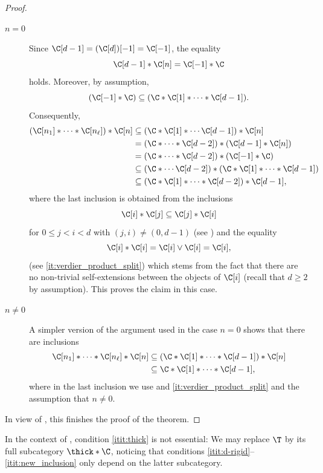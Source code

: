 \documentclass[a4paper]{amsart}
\begin{document}
\begin{proof}
  \begin{description}
  \item[$n=0$] Since $\C[d-1]=(\C[d])[-1]=\C[-1]$, the equality
    \[
      \C[d-1]*\C[n]=\C[-1]*\C
    \]
    holds. Moreover, by assumption,
    \[
      (\C[-1]*\C)\subseteq(\C*\C[1]*\cdots*\C[d-1]).
    \]
    Consequently,
    \begin{align*}
      (\C[n_1]*\cdots*\C[n_\ell])*\C[n] & \subseteq(\C*\C[1]*\cdots\C[d-1])*\C[n]               \\
                                        & =(\C*\cdots*\C[d-2])*(\C[d-1]*\C[n])                  \\
                                        & =(\C*\cdots*\C[d-2])*(\C[-1]*\C)                      \\
                                        & \subseteq(\C*\cdots\C[d-2])*(\C*\C[1]*\cdots*\C[d-1]) \\
                                        & \subseteq(\C*\C[1]*\cdots*\C[d-2])*\C[d-1],
    \end{align*}
    where the last inclusion is obtained from the inclusions
    \[
      \C[i]*\C[j]\subseteq\C[j]*\C[i]
    \]
    for $0\leq j<i<d$ with $(j,i)\neq(0,d-1)$ (see
    ) and the equality
    \[
      \C[i]*\C[i]=\C[i]\vee\C[i]=\C[i],
    \]
    (see \eqref{it:verdier_product_split}) which
    stems from the fact that there are no non-trivial self-extensions between
    the objects of $\C[i]$ (recall that $d\geq2$ by assumption). This proves the
    claim in this case.
  \item[$n\neq0$] A simpler version of the argument used in the case $n=0$ shows
    that there are inclusions
    \begin{align*}
      \C[n_1]*\cdots*\C[n_\ell]*\C[n] & \subseteq(\C*\C[1]*\cdots*\C[d-1])*\C[n] \\
                                      & \subseteq\C*\C[1]*\cdots*\C[d-1],
    \end{align*}
    where in the last inclusion we use  and
    \eqref{it:verdier_product_split} and the
    assumption that $n\neq0$.
  \end{description}
  In view of , this finishes the proof of the theorem.
\end{proof}

\begin{remark}
  \label{rmk:T_thick}
  In the context of , condition
  \eqref{itit:thick} is not essential: We may replace $\T$ by its full
  subcategory $\thick*\C$, noticing that conditions
  \eqref{itit:d-rigid}--\eqref{itit:new_inclusion} only depend on the latter
  subcategory.
\end{remark}
\end{document}
